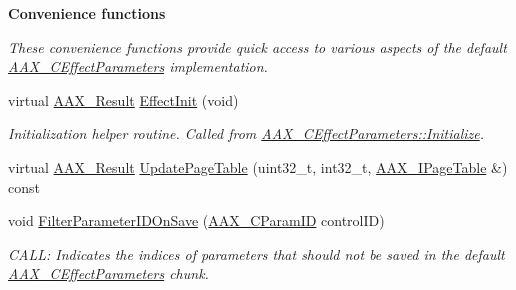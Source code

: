 \begin{Indent}\textbf{ Convenience functions}\par
{\em These convenience functions provide quick access to various aspects of the default \mbox{\hyperlink{a01481}{A\+A\+X\+\_\+\+C\+Effect\+Parameters}} implementation. }\begin{DoxyCompactItemize}
\item 
virtual \mbox{\hyperlink{a00392_a4d8f69a697df7f70c3a8e9b8ee130d2f}{A\+A\+X\+\_\+\+Result}} \mbox{\hyperlink{a01481_a2e302fd758d39a6a855023bf825fe148}{Effect\+Init}} (void)
\begin{DoxyCompactList}\small\item\em Initialization helper routine. Called from \mbox{\hyperlink{a01481_a245f235300b04f1c8b4c83831d296e22}{A\+A\+X\+\_\+\+C\+Effect\+Parameters\+::\+Initialize}}. \end{DoxyCompactList}\item 
virtual \mbox{\hyperlink{a00392_a4d8f69a697df7f70c3a8e9b8ee130d2f}{A\+A\+X\+\_\+\+Result}} \mbox{\hyperlink{a01481_a79c283d2698c39e664e590f256c51d02}{Update\+Page\+Table}} (uint32\+\_\+t, int32\+\_\+t, \mbox{\hyperlink{a01849}{A\+A\+X\+\_\+\+I\+Page\+Table}} \&) const
\item 
void \mbox{\hyperlink{a01481_a06251bbdd6ad5d6ccee160ce4cb5ee8c}{Filter\+Parameter\+I\+D\+On\+Save}} (\mbox{\hyperlink{a00392_a1440c756fe5cb158b78193b2fc1780d1}{A\+A\+X\+\_\+\+C\+Param\+ID}} control\+ID)
\begin{DoxyCompactList}\small\item\em C\+A\+LL\+: Indicates the indices of parameters that should not be saved in the default \mbox{\hyperlink{a01481}{A\+A\+X\+\_\+\+C\+Effect\+Parameters}} chunk. \end{DoxyCompactList}\end{DoxyCompactItemize}
\end{Indent}
